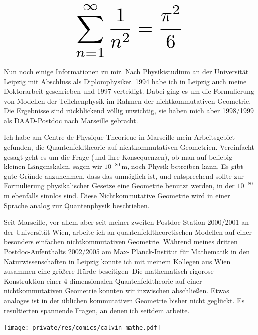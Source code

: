 \begin{multicols}{2}
\[
\resizebox{0.45\hsize}{!}{$\displaystyle\sum_{n = 1}^\infty \frac{1}{n^2} = \frac{\pi^2}{6}$}
\]

Nun noch einige Informationen zu mir. Nach Physikistudium an der Universität Leipzig mit Abschluss als Diplomphysiker. 1994 habe ich in Leipzig auch meine Doktorarbeit geschrieben und 1997 verteidigt. Dabei ging es um die Formulierung von Modellen der Teilchenphysik im Rahmen der nichtkommutativen Geometrie. Die Ergebnisse sind rückblickend völlig unwichtig, sie haben mich aber 1998/1999 als DAAD-Postdoc nach Marseille gebracht.

Ich habe am Centre de Physique Theorique in Marseille mein Arbeitsgebiet gefunden, die Quantenfeldtheorie auf nichtkommutativen Geometrien. Vereinfacht gesagt geht es um die Frage (und ihre Konsequenzen), ob man auf beliebig kleinen Längenskalen, sagen wir $10^{-80}$\,m, noch Physik betreiben kann. Es gibt gute Gründe anzunehmen, dass das unmöglich ist, und entsprechend sollte zur Formulierung physikalischer Gesetze eine Geometrie benutzt werden, in der $10^{-80}$\,m ebenfalls sinnlos sind. Diese Nichtkommutative Geometrie wird in einer Sprache analog zur Quantenphysik beschrieben.

Seit Marseille, vor allem aber seit meiner zweiten Postdoc-Station 2000/2001 an der Universität Wien, arbeite ich an quantenfeldtheoretischen Modellen auf einer besonders einfachen nichtkommutativen Geometrie. Während meines dritten Postdoc-Aufenthalts 2002/2005 am Max- Planck-Institut für Mathematik in den Naturwissenschaften in Leipzig konnte ich mit meinem Kollegen aus Wien zusammen eine größere Hürde beseitigen. Die mathematisch rigorose Konstruktion einer 4-dimensionalen Quantenfeldtheorie auf einer nichtkommutativen Geometrie konnten wir inzwischen abschließen. Etwas analoges ist in der üblichen kommutativen Geometrie bisher nicht geglückt. Es resultierten spannende Fragen, an denen ich seitdem arbeite.

\begin{center}
\texttt{[image: private/res/comics/calvin\_mathe.pdf]}
\end{center}
\end{multicols}
